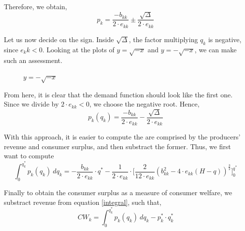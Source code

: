 \documentclass[12pt]{article}
\begin{document}
Therefore, we obtain,
\begin{equation*}
p_k = \frac{-b_{kk}}{2 \cdot e_{kk}} \pm \frac{\sqrt{\Delta}}{2 \cdot e_{kk}}
\end{equation*}

Let us now decide on the sign. Inside $\sqrt{\Delta}$, the factor multiplying $q_k$ is negative, since $e_kk < 0$. Looking at the plots of $y = \sqrt{-x}$ and $y = -\sqrt{-x}$, we can make such an assessment.\\

\begin{figure}[H]
    \begin{minipage}{0.45\textwidth}
\caption{$y = \sqrt{-x}$}
\end{minipage}\hfill
\begin{minipage}{0.45\textwidth}
\caption{$y = -\sqrt{-x}$}
    \end{minipage}
\end{figure}

From here, it is clear that the demand function should look like the first one. Since we divide by $2 \cdot e_{kk} <0$, we choose the negative root. Hence,
\begin{equation*}
p_k(q_k) = \frac{-b_{kk}}{2 \cdot e_{kk}} - \frac{\sqrt{\Delta}}{2 \cdot e_{kk}}
\end{equation*}

With this approach, it is easier to compute the are comprised by the producers' revenue and consumer surplus, and then substract the former. Thus, we first want to compute
\begin{equation} \label{integral}
\int_0^{q_k^*} p_k(q_k) \ dq_k = -\frac{b_{kk}}{2 \cdot e_{kk}} \cdot q^* -\frac{1}{2 \cdot e_{kk}} \cdot \bigg[\frac{2}{12 \cdot e_{kk}} (b_{kk}^2 - 4 \cdot e_{kk}(H - q))^{\frac{3}{2}}\bigg]_0^{q^*}
\end{equation}

Finally to obtain the consumer surplus as a measure of consumer welfare, we substract revenue from equation \ref{integral}, such that,
\begin{equation}
CW_k= \int_0^{q_k^*} p_k(q_k) \ dq_k  - p_k^* \cdot q_k^*
\end{equation}

%
\end{document}
